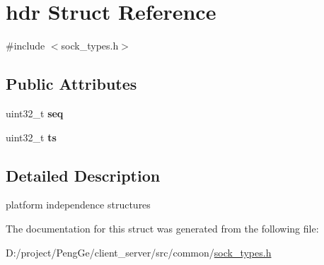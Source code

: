 \hypertarget{structhdr}{}\section{hdr Struct Reference}
\label{structhdr}


{\ttfamily \#include $<$sock\+\_\+types.\+h$>$}

\subsection*{Public Attributes}
\begin{DoxyCompactItemize}
\item 
\hypertarget{structhdr_a0dbeb3b896b93943890f22b8999fb48c}{}uint32\+\_\+t {\bfseries seq}\label{structhdr_a0dbeb3b896b93943890f22b8999fb48c}

\item 
\hypertarget{structhdr_a0902aeb74b0763203be1c07c2cbc10da}{}uint32\+\_\+t {\bfseries ts}\label{structhdr_a0902aeb74b0763203be1c07c2cbc10da}

\end{DoxyCompactItemize}


\subsection{Detailed Description}
\begin{DoxyParagraph}{platform independence structures}

\end{DoxyParagraph}


The documentation for this struct was generated from the following file\+:\begin{DoxyCompactItemize}
\item 
D\+:/project/\+Peng\+Ge/client\+\_\+server/src/common/\hyperlink{sock__types_8h}{sock\+\_\+types.\+h}\end{DoxyCompactItemize}
